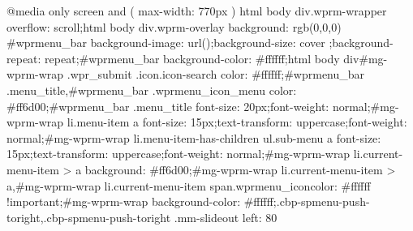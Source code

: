 @media only screen and ( max-width: 770px ) {html body div.wprm-wrapper {overflow: scroll;}html body div.wprm-overlay{ background: rgb(0,0,0) }#wprmenu_bar {background-image: url();background-size: cover ;background-repeat: repeat;}#wprmenu_bar {background-color: #ffffff;}html body div#mg-wprm-wrap .wpr_submit .icon.icon-search {color: #ffffff;}#wprmenu_bar .menu_title,#wprmenu_bar .wprmenu_icon_menu {color: #ff6d00;}#wprmenu_bar .menu_title {font-size: 20px;font-weight: normal;}#mg-wprm-wrap li.menu-item a {font-size: 15px;text-transform: uppercase;font-weight: normal;}#mg-wprm-wrap li.menu-item-has-children ul.sub-menu a {font-size: 15px;text-transform: uppercase;font-weight: normal;}#mg-wprm-wrap li.current-menu-item > a {background: #ff6d00;}#mg-wprm-wrap li.current-menu-item > a,#mg-wprm-wrap li.current-menu-item span.wprmenu_icon{color: #ffffff !important;}#mg-wprm-wrap {background-color: #ffffff;}.cbp-spmenu-push-toright,.cbp-spmenu-push-toright .mm-slideout {left: 80%
}}
